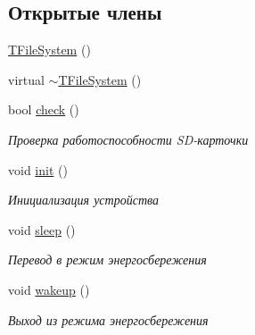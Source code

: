 \subsection*{Открытые члены}
\begin{DoxyCompactItemize}
\item 
\hyperlink{classunit_1_1_t_file_system_ac45162c4d69b6661aab204724af57322}{T\+File\+System} ()
\item 
virtual \hyperlink{classunit_1_1_t_file_system_a87299dbbdea872b06972f1432ef9ef88}{$\sim$\+T\+File\+System} ()
\item 
bool \hyperlink{classunit_1_1_t_file_system_a0737b50d219570ae2e11ea17a32cc85c}{check} ()
\begin{DoxyCompactList}\small\item\em Проверка работоспособности S\+D-\/карточки \end{DoxyCompactList}\item 
\mbox{\label{classunit_1_1_t_file_system_a036085cc2f2674f9ea89426000b6ba02}} 
void \hyperlink{classunit_1_1_t_file_system_a036085cc2f2674f9ea89426000b6ba02}{init} ()
\begin{DoxyCompactList}\small\item\em Инициализация устройства \end{DoxyCompactList}\item 
\mbox{\label{classunit_1_1_t_file_system_a4e4fd801d58a5c6b526a65ec5cb187dd}} 
void \hyperlink{classunit_1_1_t_file_system_a4e4fd801d58a5c6b526a65ec5cb187dd}{sleep} ()
\begin{DoxyCompactList}\small\item\em Перевод в режим энергосбережения \end{DoxyCompactList}\item 
\mbox{\label{classunit_1_1_t_file_system_a99d5e06aee69d3674ea441f140f6a47b}} 
void \hyperlink{classunit_1_1_t_file_system_a99d5e06aee69d3674ea441f140f6a47b}{wakeup} ()
\begin{DoxyCompactList}\small\item\em Выход из режима энергосбережения \end{DoxyCompactList}\item 
\mbox{\label{classunit_1_1_t_file_system_af7969ea11284d9f6f093687f0ba90082}} 

\end{DoxyCompactItemize}
